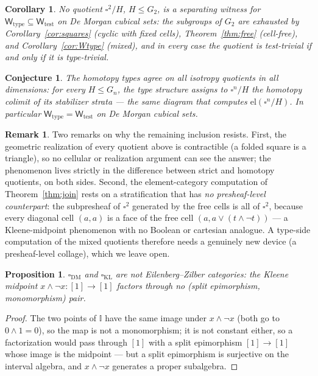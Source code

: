 \documentclass[11pt]{amsart}
\newtheorem{cor}[thm]{Corollary}
\newtheorem{prop}[thm]{Proposition}
\newtheorem{conj}[thm]{Conjecture}
\theoremstyle{definition}
\newtheorem{rem}[thm]{Remark}
\newcommand{\I}{\mathbb{I}}
\newcommand{\cube}{\square_{\mathrm{DM}}}
\newcommand{\cubeK}{\square_{\mathrm{KL}}}
\newcommand{\el}{\mathrm{el}}
\newcommand{\Wtest}{\mathsf{W}_{\mathrm{test}}}
\newcommand{\Wtype}{\mathsf{W}_{\mathrm{type}}}
\begin{document}
\begin{cor}
  \label{cor:nosep}
  No quotient $\square^2/H$, $H \leq G_2$, is a separating witness
  for $\Wtype \subseteq \Wtest$ on De Morgan cubical sets: the
  subgroups of $G_2$ are exhausted by
  Corollary~\ref{cor:squares} (cyclic with fixed cells),
  Theorem~\ref{thm:free} (cell-free), and
  Corollary~\ref{cor:Wtype} (mixed), and in every case the
  quotient is test-trivial if and only if it is type-trivial.
\end{cor}

\begin{conj}
  \label{conj:agree}
  The homotopy types agree on all isotropy quotients in all
  dimensions: for every $H \leq G_n$, the type structure assigns
  to $\square^n/H$ the homotopy colimit of its stabilizer strata
  --- the same diagram that computes $\el(\square^n/H)$.  In
  particular $\Wtype = \Wtest$ on De Morgan cubical sets.
\end{conj}

\begin{rem}
  \label{rem:obstacle}
  Two remarks on why the remaining inclusion resists.  First, the
  geometric realization of every quotient above is contractible
  (a folded square is a triangle), so no cellular or realization
  argument can see the answer; the phenomenon lives strictly in
  the difference between strict and homotopy quotients, on both
  sides.  Second, the element-category computation of
  Theorem~\ref{thm:join} rests on a stratification that has
  \emph{no presheaf-level counterpart}: the subpresheaf of
  $\square^2$ generated by the free cells is all of $\square^2$,
  because every diagonal cell $(a,a)$ is a face of the free cell
  $(a, a \vee (t \wedge \neg t))$ --- a Kleene-midpoint
  phenomenon with no Boolean or cartesian analogue.  A type-side
  computation of the mixed quotients therefore needs a genuinely
  new device (a presheaf-level collage), which we leave open.
\end{rem}

\begin{prop}
  \label{prop:ez}
  $\cube$ and $\cubeK$ are not Eilenberg--Zilber categories: the
  Kleene midpoint $x \wedge \neg x : [1] \to [1]$ factors through
  no (split epimorphism, monomorphism) pair.
\end{prop}

\begin{proof}
  The two points of $\I$ have the same image under
  $x \wedge \neg x$ (both go to $0 \wedge 1 = 0$), so the map is
  not a monomorphism; it is not constant either, so a
  factorization would pass through $[1]$ with a split epimorphism
  $[1] \to [1]$ whose image is the midpoint --- but a split
  epimorphism is surjective on the interval algebra, and
  $x \wedge \neg x$ generates a proper subalgebra.
\end{proof}
\end{document}
